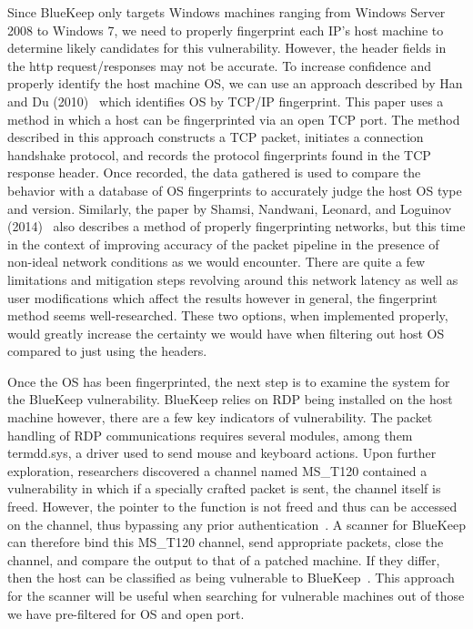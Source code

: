 Since BlueKeep only targets Windows machines ranging from Windows Server 2008 to Windows 7, we need to properly fingerprint each IP's host machine to determine likely candidates for this vulnerability. However, the header fields in the http request/responses may not be accurate. To increase confidence and properly identify the host machine OS, we can use an approach described by Han and Du (2010)~\cite{han_du_2010} which identifies OS by TCP/IP fingerprint. This paper uses a method in which a host can be fingerprinted via an open TCP port. The method described in this approach constructs a TCP packet, initiates a connection handshake protocol, and records the protocol fingerprints found in the TCP response header. Once recorded, the data gathered is used to compare the behavior with a database of OS fingerprints to accurately judge the host OS type and version. Similarly, the paper by Shamsi, Nandwani, Leonard, and Loguinov (2014)~\cite{zain_ankur_derek_log_2014} also describes a method of properly fingerprinting networks, but this time in the context of improving accuracy of the packet pipeline in the presence of non-ideal network conditions as we would encounter. There are quite a few limitations and mitigation steps revolving around this network latency as well as user modifications which affect the results however in general, the fingerprint method seems well-researched. These two options, when implemented properly, would greatly increase the certainty we would have when filtering out host OS compared to just using the headers.

Once the OS has been fingerprinted, the next step is to examine the system for the BlueKeep vulnerability. BlueKeep relies on RDP being installed on the host machine however, there are a few key indicators of vulnerability. The packet handling of RDP communications requires several modules, among them termdd.sys, a driver used to send mouse and keyboard actions. Upon further exploration, researchers discovered a channel named MS\_T120 contained a vulnerability in which if a specially crafted packet is sent, the channel itself is freed. However, the pointer to the function is not freed and thus can be accessed on the channel, thus bypassing any prior authentication~\cite{go_zingbox_com_2019}. A scanner for BlueKeep can therefore bind this MS\_T120 channel, send appropriate packets, close the channel, and compare the output to that of a patched machine. If they differ, then the host can be classified as being vulnerable to BlueKeep~\cite{dillon_2019}. This approach for the scanner will be useful when searching for vulnerable machines out of those we have pre-filtered for OS and open port.

